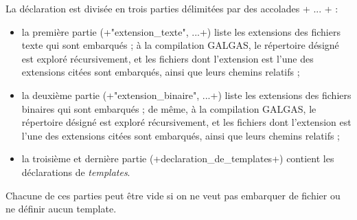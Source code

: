 La déclaration est divisée en trois parties délimitées par des accolades \ggsq+{ ... }+ :
\begin{itemize}
  \item la première partie (\ggsq+"extension_texte", ...+) liste les extensions des fichiers texte qui sont embarqués ; à la compilation GALGAS, le répertoire désigné est exploré récursivement, et les fichiers dont l'extension est l'une des extensions citées sont embarqués, ainsi que leurs chemins relatifs ;
  \item la deuxième partie (\ggsq+"extension_binaire", ...+) liste les extensions des fichiers binaires qui sont embarqués ; de même, à la compilation GALGAS, le répertoire désigné est exploré récursivement, et les fichiers dont l'extension est l'une des extensions citées sont embarqués, ainsi que leurs chemins relatifs ;
  \item la troisième et dernière partie (\ggsq+declaration_de_templates+) contient les déclarations de \emph{templates}.
\end{itemize}

Chacune de ces parties peut être vide si on ne veut pas embarquer de fichier ou ne définir aucun template.


